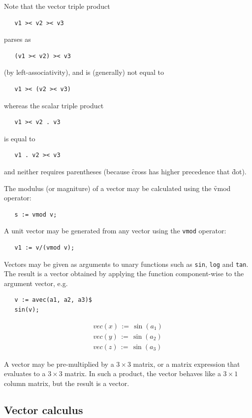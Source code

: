 Note that the vector triple product
\begin{verbatim}
   v1 >< v2 >< v3
\end{verbatim}
parses as
\begin{verbatim}
   (v1 >< v2) >< v3
\end{verbatim}
(by left-associativity), and is (generally) not equal to
\begin{verbatim}
   v1 >< (v2 >< v3)
\end{verbatim}
whereas the scalar triple product
\begin{verbatim}
   v1 >< v2 . v3
\end{verbatim}
is equal to
\begin{verbatim}
   v1 . v2 >< v3
\end{verbatim}
and neither requires parentheses (because \f{cross} has higher
precedence that \f{dot}).

\hypertarget{operator:VMOD}{}
The modulus (or magniture) of a vector may be calculated using
the \f{vmod} operator:
\begin{verbatim}
   s := vmod v;
\end{verbatim}
A unit vector may be generated from any vector using the \texttt{vmod}
operator:
\begin{verbatim}
   v1 := v/(vmod v);
\end{verbatim}

Vectors may be given as arguments to unary functions such as \texttt{sin},
\texttt{log} and \texttt{tan}. The result is a vector obtained by
applying the function component-wise to the argument vector, e.g.
\begin{verbatim}
   v := avec(a1, a2, a3)$
   sin(v);
\end{verbatim}
\begin{gather*}
vec(x)\,:=\,\sin(a_{1})\\
vec(y)\,:=\,\sin(a_{2})\\
vec(z)\,:=\,\sin(a_{3})
\end{gather*}

A vector may be pre-multiplied by a $3\times3$ matrix, or a matrix
expression that evaluates to a $3\times3$ matrix.  In such a product,
the vector behaves like a $3\times1$ column matrix, but the result is
a vector.


\subsection{Vector calculus}

